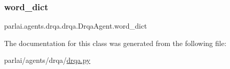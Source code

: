 \subsubsection{\texorpdfstring{word\+\_\+dict}{word\_dict}}
{\footnotesize\ttfamily parlai.\+agents.\+drqa.\+drqa.\+Drqa\+Agent.\+word\+\_\+dict}



The documentation for this class was generated from the following file\+:\begin{DoxyCompactItemize}
\item 
parlai/agents/drqa/\hyperlink{drqa_8py}{drqa.\+py}\end{DoxyCompactItemize}
